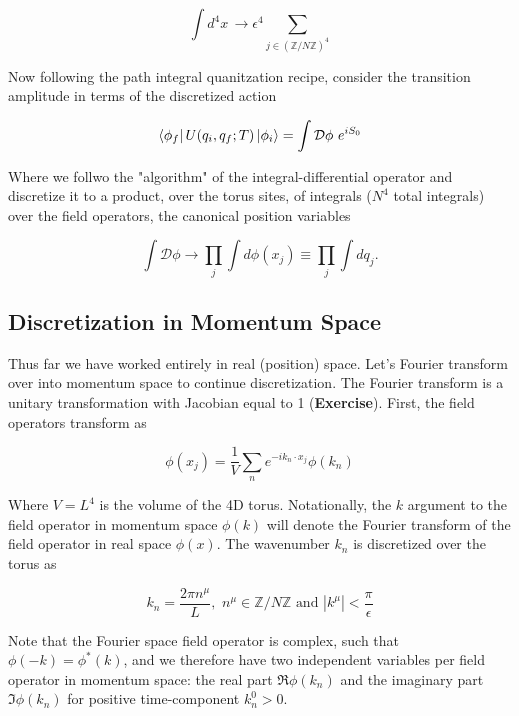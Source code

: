 \begin{equation}
\int d^4 x \, \rightarrow \epsilon^4 \sum_{j \in (\mathbb{Z}/N\mathbb{Z})^4}
\end{equation}

\noindent Now following the path integral quanitzation recipe, consider the transition amplitude in terms of the discretized action

\begin{equation}
\bra{\phi_f} U(q_i, q_f; T) \ket{\phi_i} = \int \mathcal{D} \phi \,\, e^{i S_0}
\end{equation}

\noindent Where we follwo the "algorithm" of the integral-differential operator and discretize it to a product, over the torus sites, of integrals ($N^4$ total integrals) over the field operators, the canonical position variables 

\begin{equation}
\int \mathcal{D} \phi \rightarrow \prod_j \int d \phi (x_j) \equiv \prod_j \int d q_j.
\end{equation}

\subsection*{Discretization in Momentum Space}

\noindent Thus far we have worked entirely in real (position) space. Let's Fourier transform over into momentum space to continue discretization. The Fourier transform is a unitary transformation with Jacobian equal to 1 (\textbf{Exercise}). First, the field operators transform as

\begin{equation}
\phi (x_j) = \frac{1}{V} \sum_n e^{-i k_n \cdot x_j} \phi (k_n)
\end{equation}

\noindent Where $V=L^4$ is the volume of the 4D torus. Notationally, the $k$ argument to the field operator in momentum space $\phi (k)$ will denote the Fourier transform of the field operator in real space $\phi (x)$. The wavenumber $k_n$ is discretized over the torus as

\begin{equation}
k_n = \frac{2 \pi n^\mu}{L}, \,\, n^\mu \in \mathbb{Z}/N\mathbb{Z} \,\, \text{and} \,\, |k^\mu| < \frac{\pi}{\epsilon}
\end{equation}

\noindent Note that the Fourier space field operator is complex, such that $\phi(-k) = \phi^* (k)$, and we therefore have two independent variables per field operator in momentum space: the real part $\Re \phi (k_n)$ and the imaginary part $\Im \phi (k_n)$ for positive time-component $k_n^0 > 0$.

